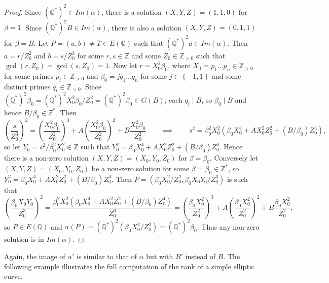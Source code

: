 \documentclass{article}
\newcommand{\Z}{\mathbb{Z}}
\newcommand{\Q}{\mathbb{Q}}
\newcommand{\rb}[1]{\left( #1 \right)}
\newcommand{\cb}[1]{\left\{ #1 \right\}}
\theoremstyle{definition}\newtheorem*{definition}{Definition}
\theoremstyle{definition}\newtheorem*{example}{Example}
\theoremstyle{definition}\newtheorem*{remark}{Remark}
\begin{document}
\begin{proof}
Since $ \rb{\Q^*}^2 \in Im\rb{\alpha} $, there is a solution $ \rb{X, Y, Z} = \rb{1, 1, 0} $ for $ \beta = 1 $. Since $ \rb{\Q^*}^2B \in Im\rb{\alpha} $, there is also a solution $ \rb{X, Y, Z} = \rb{0, 1, 1} $ for $ \beta = B $. Let $ P = \rb{a, b} \ne T \in E\rb{\Q} $ such that $ \rb{\Q^*}^2a \in Im\rb{\alpha} $. Then $ a = r / Z_0^2 $ and $ b = s / Z_0^3 $ for some $ r, s \in \Z $ and some $ Z_0 \in \Z_{> 0} $ such that $ \gcd\rb{r, Z_0} = \gcd\rb{s, Z_0} = 1 $. Now let $ r = X_0^2\beta_0 $, where $ X_0 = p_1 \dots p_n \in \Z_{> 0} $ for some primes $ p_i \in \Z_{> 0} $ and $ \beta_0 = j q_1 \dots q_n $ for some $ j \in \cb{-1, 1} $ and some distinct primes $ q_i \in \Z_{> 0} $. Since $ \rb{\Q^*}^2\beta_0 = \rb{\Q^*}^2X_0^2\beta_0 / Z_0^2 = \rb{\Q^*}^2\beta_0 \in G\rb{B} $, each $ q_i \mid B $, so $ \beta_0 \mid B $ and hence $ B / \beta_0 \in \Z^* $. Then
$$ \rb{\dfrac{s}{Z_0^3}}^2 = \rb{\dfrac{X_0^2\beta_0}{Z_0^2}}^3 + A\rb{\dfrac{X_0^2\beta_0}{Z_0^2}}^2 + B\dfrac{X_0^2\beta_0}{Z_0^2} \qquad \implies \qquad s^2 = \beta_0^2X_0^2\rb{\beta_0X_0^4 + AX_0^2Z_0^2 + \rb{B / \beta_0}Z_0^4}, $$
so let $ Y_0 = s^2 / \beta_0^2X_0^2 \in \Z $ such that $ Y_0^2 = \beta_0X_0^4 + AX_0^2Z_0^2 + \rb{B / \beta_0}Z_0^4 $. Hence there is a non-zero solution $ \rb{X, Y, Z} = \rb{X_0, Y_0, Z_0} $ for $ \beta = \beta_0 $. Conversely let $ \rb{X, Y, Z} = \rb{X_0, Y_0, Z_0} $ be a non-zero solution for some $ \beta = \beta_0 \in \Z^* $, so $ Y_0^2 = \beta_0 X_0^4 + AX_0^2Z_0^2 + \rb{B / \beta_0}Z_0^4 $. Then $ P = \rb{\beta_0 X_0^2 / Z_0^2, \beta_0 X_0Y_0 / Z_0^3} $ is such that
$$ \rb{\dfrac{\beta_0 X_0Y_0}{Z_0^3}}^2 = \dfrac{\beta_0^2X_0^2\rb{\beta_0 X_0^4 + AX_0^2Z_0^2 + \rb{B / \beta_0}Z_0^4}}{Z_0^6} = \rb{\dfrac{\beta_0 X_0^2}{Z_0^2}}^3 + A\rb{\dfrac{\beta_0 X_0^2}{Z_0^2}}^2 + B\dfrac{\beta_0 X_0^2}{Z_0^2}, $$
so $ P \in E\rb{\Q} $ and $ \alpha\rb{P} = \rb{\Q^*}^2\rb{\beta_0 X_0^2 / Z_0^2} = \rb{\Q^*}^2\beta_0 $. Thus any non-zero solution is in $ Im\rb{\alpha} $.
\end{proof}

Again, the image of $ \alpha' $ is similar to that of $ \alpha $ but with $ B' $ instead of $ B $. The following example illustrates the full computation of the rank of a simple elliptic curve.
\end{document}
